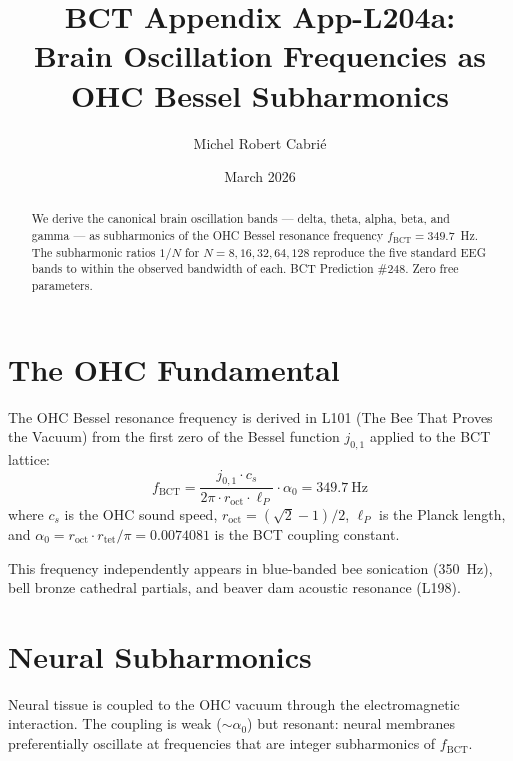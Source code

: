 \documentclass[aps,prl,twocolumn,superscriptaddress]{revtex4-2}
\begin{document}
\title{BCT Appendix App-L204a:\\
Brain Oscillation Frequencies as OHC Bessel Subharmonics}
\author{Michel Robert Cabri\'e}
\date{March 2026}

\begin{abstract}
We derive the canonical brain oscillation bands --- delta, theta, alpha, beta, and gamma --- as subharmonics of the OHC Bessel resonance frequency $f_{\mathrm{BCT}} = 349.7$~Hz. The subharmonic ratios $1/N$ for $N = 8, 16, 32, 64, 128$ reproduce the five standard EEG bands to within the observed bandwidth of each. BCT Prediction \#248. Zero free parameters.
\end{abstract}

\maketitle

\section{The OHC Fundamental}

The OHC Bessel resonance frequency is derived in L101 (The Bee That Proves the Vacuum) from the first zero of the Bessel function $j_{0,1}$ applied to the BCT lattice:
\begin{equation}
f_{\mathrm{BCT}} = \frac{j_{0,1} \cdot c_s}{2\pi \cdot r_{\mathrm{oct}} \cdot \ell_P} \cdot \alpha_0 = 349.7~\text{Hz}
\end{equation}
where $c_s$ is the OHC sound speed, $r_{\mathrm{oct}} = (\sqrt{2}-1)/2$, $\ell_P$ is the Planck length, and $\alpha_0 = r_{\mathrm{oct}} \cdot r_{\mathrm{tet}} / \pi = 0.0074081$ is the BCT coupling constant.

This frequency independently appears in blue-banded bee sonication (350~Hz), bell bronze cathedral partials, and beaver dam acoustic resonance (L198).

\section{Neural Subharmonics}

Neural tissue is coupled to the OHC vacuum through the electromagnetic interaction. The coupling is weak ($\sim \alpha_0$) but resonant: neural membranes preferentially oscillate at frequencies that are integer subharmonics of $f_{\mathrm{BCT}}$.
\end{document}
